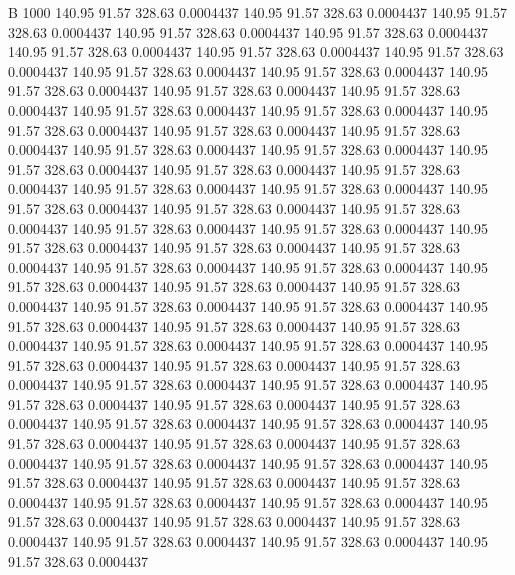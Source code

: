


B 1000
 140.95   91.57  328.63   0.0004437
 140.95   91.57  328.63   0.0004437
 140.95   91.57  328.63   0.0004437
 140.95   91.57  328.63   0.0004437
 140.95   91.57  328.63   0.0004437
 140.95   91.57  328.63   0.0004437
 140.95   91.57  328.63   0.0004437
 140.95   91.57  328.63   0.0004437
 140.95   91.57  328.63   0.0004437
 140.95   91.57  328.63   0.0004437
 140.95   91.57  328.63   0.0004437
 140.95   91.57  328.63   0.0004437
 140.95   91.57  328.63   0.0004437
 140.95   91.57  328.63   0.0004437
 140.95   91.57  328.63   0.0004437
 140.95   91.57  328.63   0.0004437
 140.95   91.57  328.63   0.0004437
 140.95   91.57  328.63   0.0004437
 140.95   91.57  328.63   0.0004437
 140.95   91.57  328.63   0.0004437
 140.95   91.57  328.63   0.0004437
 140.95   91.57  328.63   0.0004437
 140.95   91.57  328.63   0.0004437
 140.95   91.57  328.63   0.0004437
 140.95   91.57  328.63   0.0004437
 140.95   91.57  328.63   0.0004437
 140.95   91.57  328.63   0.0004437
 140.95   91.57  328.63   0.0004437
 140.95   91.57  328.63   0.0004437
 140.95   91.57  328.63   0.0004437
 140.95   91.57  328.63   0.0004437
 140.95   91.57  328.63   0.0004437
 140.95   91.57  328.63   0.0004437
 140.95   91.57  328.63   0.0004437
 140.95   91.57  328.63   0.0004437
 140.95   91.57  328.63   0.0004437
 140.95   91.57  328.63   0.0004437
 140.95   91.57  328.63   0.0004437
 140.95   91.57  328.63   0.0004437
 140.95   91.57  328.63   0.0004437
 140.95   91.57  328.63   0.0004437
 140.95   91.57  328.63   0.0004437
 140.95   91.57  328.63   0.0004437
 140.95   91.57  328.63   0.0004437
 140.95   91.57  328.63   0.0004437
 140.95   91.57  328.63   0.0004437
 140.95   91.57  328.63   0.0004437
 140.95   91.57  328.63   0.0004437
 140.95   91.57  328.63   0.0004437
 140.95   91.57  328.63   0.0004437
 140.95   91.57  328.63   0.0004437
 140.95   91.57  328.63   0.0004437
 140.95   91.57  328.63   0.0004437
 140.95   91.57  328.63   0.0004437
 140.95   91.57  328.63   0.0004437
 140.95   91.57  328.63   0.0004437
 140.95   91.57  328.63   0.0004437
 140.95   91.57  328.63   0.0004437
 140.95   91.57  328.63   0.0004437
 140.95   91.57  328.63   0.0004437
 140.95   91.57  328.63   0.0004437
 140.95   91.57  328.63   0.0004437
 140.95   91.57  328.63   0.0004437
 140.95   91.57  328.63   0.0004437
 140.95   91.57  328.63   0.0004437
 140.95   91.57  328.63   0.0004437
 140.95   91.57  328.63   0.0004437
 140.95   91.57  328.63   0.0004437
 140.95   91.57  328.63   0.0004437
 140.95   91.57  328.63   0.0004437
 140.95   91.57  328.63   0.0004437
